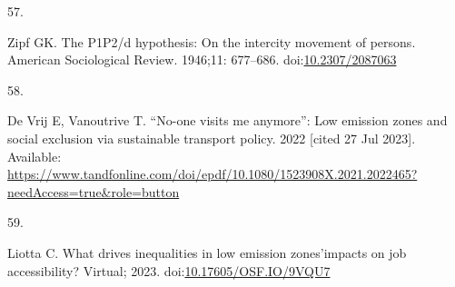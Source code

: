 \documentclass[10pt,letterpaper]{article}
\newlength{\cslhangindent}
\newlength{\csllabelwidth}
\newlength{\cslentryspacingunit} %
\newenvironment{CSLReferences}[2] %
 {%
  \setlength{\parindent}{0pt}
  \ifodd #1
  \let\oldpar\par
  \def\par{\hangindent=\cslhangindent\oldpar}
  \fi
  \setlength{\parskip}{#2\cslentryspacingunit}
 }%
 {}
\newcommand{\CSLLeftMargin}[1]{\parbox[t]{\csllabelwidth}{#1}}
\newcommand{\CSLRightInline}[1]{\parbox[t]{\linewidth - \csllabelwidth}{#1}\break}
\begin{document}
\begin{CSLReferences}{0}{0}
\leavevmode{}%
\CSLLeftMargin{57. }%
\CSLRightInline{Zipf GK. The P1P2/d hypothesis: On the intercity
movement of persons. American Sociological Review. 1946;11: 677--686.
doi:\href{https://doi.org/10.2307/2087063}{10.2307/2087063}}

\leavevmode{}%
\CSLLeftMargin{58. }%
\CSLRightInline{De Vrij E, Vanoutrive T. {``No-one visits me anymore''}:
Low emission zones and social exclusion via sustainable transport
policy. 2022 {[}cited 27 Jul 2023{]}. Available:
\url{https://www.tandfonline.com/doi/epdf/10.1080/1523908X.2021.2022465?needAccess=true\&role=button}}

\leavevmode{}%
\CSLLeftMargin{59. }%
\CSLRightInline{Liotta C. What drives inequalities in low emission
zones'impacts on job accessibility? Virtual; 2023.
doi:\href{https://doi.org/10.17605/OSF.IO/9VQU7}{10.17605/OSF.IO/9VQU7}}

\end{CSLReferences}

\nolinenumbers
\end{document}
